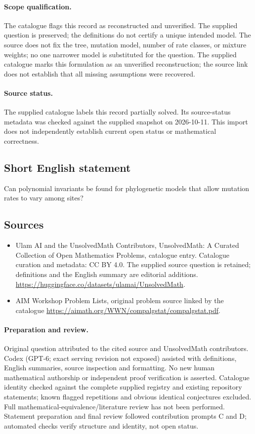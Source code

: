 \documentclass[11pt]{article}
\begin{document}
\paragraph{Scope qualification.}
The catalogue flags this record as reconstructed and unverified. The supplied question is preserved; the definitions do not certify a unique intended model. The source does not fix the tree, mutation model, number of rate classes, or mixture weights; no one narrower model is substituted for the question.
The supplied catalogue marks this formulation as an unverified reconstruction; the source link does not establish that all missing assumptions were recovered.
\paragraph{Source status.}
The supplied catalogue labels this record partially solved. Its source-status metadata was checked against the supplied snapshot on 2026-10-11. This import does not independently establish current open status or mathematical correctness.
\subsection{Short English statement}
Can polynomial invariants be found for phylogenetic models that allow mutation rates to vary among sites?
\subsection{Sources}
\begin{itemize}
\item[S1] Ulam AI and the UnsolvedMath Contributors, UnsolvedMath: A Curated Collection of Open Mathematics Problems, catalogue entry. Catalogue curation and metadata: CC BY 4.0. The supplied source question is retained; definitions and the English summary are editorial additions.
\url{https://huggingface.co/datasets/ulamai/UnsolvedMath}.
\item[S2] AIM Workshop Problem Lists, original problem source linked by the catalogue
\url{https://aimath.org/WWN/compalgstat/compalgstat.pdf}.
\end{itemize}
\paragraph{Preparation and review.}
Original question attributed to the cited source and UnsolvedMath contributors. Codex (GPT-6; exact serving revision not exposed) assisted with definitions, English summaries, source inspection and formatting. No new human mathematical authorship or independent proof verification is asserted. Catalogue identity checked against the complete supplied registry and existing repository statements; known flagged repetitions and obvious identical conjectures excluded. Full mathematical-equivalence/literature review has not been performed. Statement preparation and final review followed contribution prompts C and D; automated checks verify structure and identity, not open status.
\label{end:statement}
\end{document}
